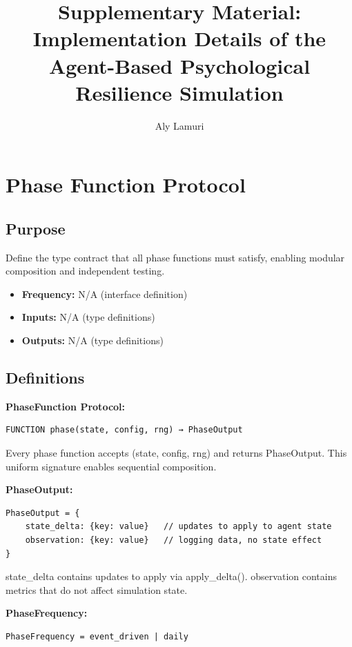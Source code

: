 \documentclass[
  letterpaper,
  DIV=11,
  numbers=noendperiod]{scrartcl}
\title{Supplementary Material: Implementation Details of the Agent-Based
Psychological Resilience Simulation}
\author{Aly Lamuri}
\date{}
\providecommand{\tightlist}{%
  \setlength{\itemsep}{0pt}\setlength{\parskip}{0pt}}
\begin{document}
\maketitle


\section{Phase Function Protocol}\label{phase-function-protocol}

\subsection{Purpose}\label{purpose}

Define the type contract that all phase functions must satisfy, enabling
modular composition and independent testing.

\begin{itemize}
\tightlist
\item
  \textbf{Frequency:} N/A (interface definition)
\item
  \textbf{Inputs:} N/A (type definitions)
\item
  \textbf{Outputs:} N/A (type definitions)
\end{itemize}

\subsection{Definitions}\label{definitions}

\textbf{PhaseFunction Protocol:}

\begin{verbatim}
FUNCTION phase(state, config, rng) → PhaseOutput
\end{verbatim}

Every phase function accepts (state, config, rng) and returns
PhaseOutput. This uniform signature enables sequential composition.

\textbf{PhaseOutput:}

\begin{verbatim}
PhaseOutput = {
    state_delta: {key: value}   // updates to apply to agent state
    observation: {key: value}   // logging data, no state effect
}
\end{verbatim}

state\_delta contains updates to apply via apply\_delta(). observation
contains metrics that do not affect simulation state.

\textbf{PhaseFrequency:}

\begin{verbatim}
PhaseFrequency = event_driven | daily
\end{verbatim}
\end{document}
